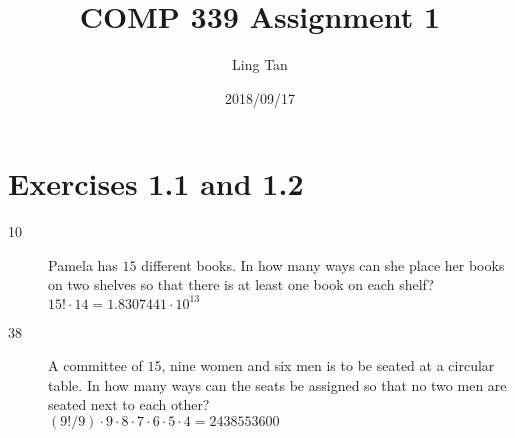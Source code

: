 \documentclass[a4paper]{article}
\title{COMP 339 Assignment 1}
\author{Ling Tan}
\date{2018/09/17}
\begin{document}
\maketitle

\section*{Exercises 1.1 and 1.2}
\begin{description}
\item[10]
Pamela has $15$ different books. In how many ways can she place her books on two shelves so that there is at least one book on each shelf?\\
$15! \cdot 14 = 1.8307441\cdot10^{13}$
\item[38]
A committee of $15$, nine women and six men is to be seated at a circular table. In how many ways can the seats be assigned so that no two men are seated next to each other?\\
$(9!/9) \cdot 9 \cdot 8 \cdot 7 \cdot 6 \cdot 5 \cdot 4 = 2438553600 $
\end{description}
\end{document}

